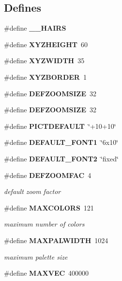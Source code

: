 \subsection*{Defines}
\begin{CompactItemize}
\item 
\#define {\bf \_\-\_\-HAIRS}\label{xtv_8h_a0}

\item 
\#define {\bf XYZHEIGHT}\ 60\label{xtv_8h_a1}

\item 
\#define {\bf XYZWIDTH}\ 35\label{xtv_8h_a2}

\item 
\#define {\bf XYZBORDER}\ 1\label{xtv_8h_a3}

\item 
\#define {\bf DEFZOOMSIZE}\ 32\label{xtv_8h_a4}

\item 
\#define {\bf DEFZOOMSIZE}\ 32\label{xtv_8h_a5}

\item 
\#define {\bf PICTDEFAULT}\ \char`\"{}+10+10\char`\"{}\label{xtv_8h_a6}

\item 
\#define {\bf DEFAULT\_\-FONT1}\ \char`\"{}6x10\char`\"{}\label{xtv_8h_a7}

\item 
\#define {\bf DEFAULT\_\-FONT2}\ \char`\"{}fixed\char`\"{}\label{xtv_8h_a8}

\item 
\#define {\bf DEFZOOMFAC}\ 4\label{xtv_8h_a9}

\begin{CompactList}\small\item\em default zoom factor \item\end{CompactList}\item 
\#define {\bf MAXCOLORS}\ 121\label{xtv_8h_a10}

\begin{CompactList}\small\item\em maximum number of colors \item\end{CompactList}\item 
\#define {\bf MAXPALWIDTH}\ 1024\label{xtv_8h_a11}

\begin{CompactList}\small\item\em maximum palette size \item\end{CompactList}\item 
\#define {\bf MAXVEC}\ 400000\label{xtv_8h_a12}


\end{CompactItemize}
